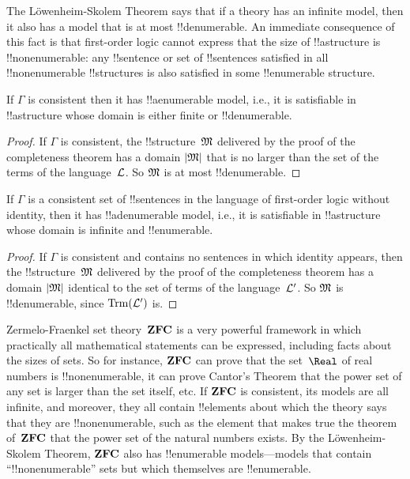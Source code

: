 \documentclass[../../../include/open-logic-section]{subfiles}
\begin{document}

The L\"owenheim-Skolem Theorem says that if a theory has an infinite
model, then it also has a model that is at most !!{denumerable}. An
immediate consequence of this fact is that first-order logic cannot
express that the size of !!a{structure} is !!{nonenumerable}: any
!!{sentence} or set of !!{sentence}s satisfied in all
!!{nonenumerable} !!{structure}s is also satisfied in some
!!{enumerable} structure.

\begin{thm} 
 If $\Gamma$ is consistent then it has
!!a{enumerable} model, i.e., it is satisfiable in !!a{structure}
whose domain is either finite or !!{denumerable}.
\end{thm}

\begin{proof}
If $\Gamma$ is consistent, the !!{structure}~$\Struct M$ delivered by
the proof of the completeness theorem has a domain $\Domain{M}$ that
is no larger than the set of the terms of the language~$\Lang L$. So
$\Struct M$ is at most !!{denumerable}.
\end{proof}

\begin{thm}
 If $\Gamma$ is a consistent set of !!{sentence}s
in the language of first-order logic without identity, then it has
!!a{denumerable} model, i.e., it is satisfiable in !!a{structure}
whose domain is infinite and !!{enumerable}.
\end{thm}

\begin{proof}
If $\Gamma$ is consistent and contains no sentences in which identity
appears, then the !!{structure}~$\Struct M$ delivered by the proof of
the completeness theorem has a domain $\Domain{M}$ identical to the set
of terms of the language~$\Lang L'$. So $\Struct{M}$ is
!!{denumerable}, since $\Trm[L']$ is.
\end{proof}

\begin{ex}
Zermelo-Fraenkel set theory~$\Log{ZFC}$ is a very powerful framework
in which practically all mathematical statements can be expressed,
including facts about the sizes of sets. So for instance, $\Log{ZFC}$
can prove that the set~$\Real$ of real numbers is !!{nonenumerable},
it can prove Cantor's Theorem that the power set of any set is larger
than the set itself, etc.  If $\Log{ZFC}$ is consistent, its models
are all infinite, and moreover, they all contain !!{element}s about
which the theory says that they are !!{nonenumerable}, such as the
element that makes true the theorem of~$\Log{ZFC}$ that the power set
of the natural numbers exists. By the L\"owenheim-Skolem Theorem,
$\Log{ZFC}$ also has !!{enumerable} models---models that contain
``!!{nonenumerable}'' sets but which themselves are !!{enumerable}.
\end{ex}
\end{document}
